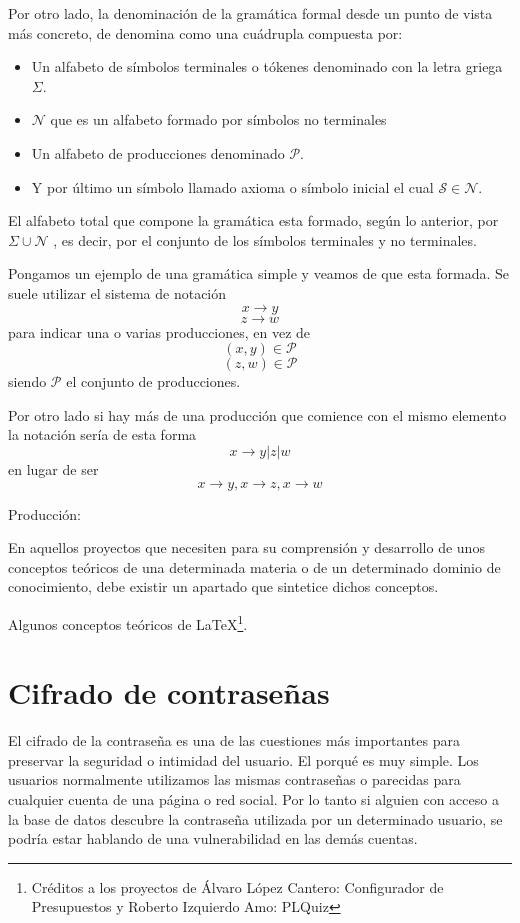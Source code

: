Por otro lado, la denominación de la gramática formal desde un punto de vista más concreto, de denomina como una cuádrupla compuesta por:

\begin{itemize}
	\item Un alfabeto de símbolos terminales o tókenes denominado con la letra griega $\Sigma$.
	\item $\mathcal{N}$ que es un alfabeto formado por símbolos no terminales
	\item Un alfabeto de producciones denominado $\mathcal{P}$.
	\item Y por último un símbolo llamado axioma o símbolo inicial el cual $\mathcal{S} \in \mathcal{N}$.
\end{itemize}

El alfabeto total que compone la gramática esta formado, según lo anterior, por $\Sigma\cup\mathcal{N}$ , es decir, por el conjunto de los símbolos terminales y no terminales.

Pongamos un ejemplo de una gramática simple y veamos de que esta formada. Se suele utilizar el sistema de notación  \[x \rightarrow y\] \[z \rightarrow w\] para indicar una o varias producciones, en vez de \[(x, y) \in \mathcal{P} \] \[(z, w) \in \mathcal{P} \] siendo $\mathcal{P}$ el conjunto de producciones.

Por otro lado si hay más de una producción que comience con el mismo elemento la notación sería de esta forma \[ x \rightarrow y | z | w\] en lugar de ser \[ x \rightarrow y, x \rightarrow z, x \rightarrow w\]


Producción: 

En aquellos proyectos que necesiten para su comprensión y desarrollo de unos conceptos teóricos de una determinada materia o de un determinado dominio de conocimiento, debe existir un apartado que sintetice dichos conceptos.

Algunos conceptos teóricos de \LaTeX \footnote{Créditos a los proyectos de Álvaro López Cantero: Configurador de Presupuestos y Roberto Izquierdo Amo: PLQuiz}.

\section{Cifrado de contraseñas}

El cifrado de la contraseña es una de las cuestiones más importantes para preservar la seguridad o intimidad del usuario. El porqué es muy simple. Los usuarios normalmente utilizamos las mismas contraseñas o parecidas para cualquier cuenta de una página o red social. Por lo tanto si alguien con acceso a la base de datos descubre la contraseña utilizada por un determinado usuario, se podría estar hablando de una vulnerabilidad en las demás cuentas.

